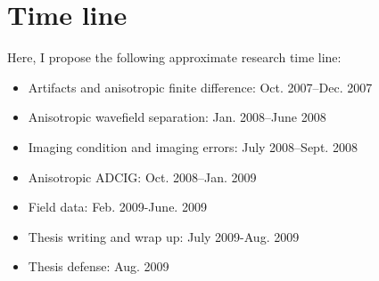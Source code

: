 \section{Time line}
Here, I propose the following approximate research time line:
\begin{itemize}
\item Artifacts and anisotropic finite difference: Oct. 2007--Dec. 2007
\item Anisotropic wavefield separation: Jan. 2008--June 2008
\item Imaging condition and imaging errors: July 2008--Sept. 2008
\item Anisotropic ADCIG: Oct. 2008--Jan. 2009
\item Field data: Feb. 2009-June. 2009
\item Thesis writing and wrap up: July 2009-Aug. 2009
\item Thesis defense: Aug. 2009
\end{itemize}



\newpage
{}

%


